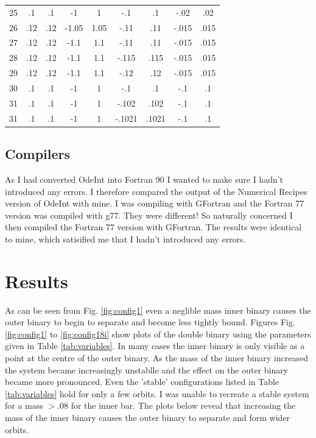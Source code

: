 \documentclass[a4paper,12pt]{article}
\begin{document}
\begin{table}[ht!]
\begin{tabular}{ccccccccc}
   25 & .1 & .1 & -1 & 1 & -.1 & .1 & -.02 & .02\\
   26 & .12 & .12 & -1.05 & 1.05 & -.11 & .11 & -.015 & .015\\
   27 & .12 & .12 & -1.1 & 1.1 & -.11 & .11 & -.015 & .015\\
   28 & .12 & .12 & -1.1 & 1.1 & -.115 & .115 & -.015 & .015\\
   29 & .12 & .12 & -1.1 & 1.1 & -.12 & .12 & -.015 & .015\\
   30 & .1 & .1 & -1 & 1 & -.1 & .1 & -.1 & .1\\
   31 & .1 & .1 & -1 & 1 & -.102 & .102 & -.1 & .1\\
   31 & .1 & .1 & -1 & 1 & -.1021 & .1021 & -.1 & .1\\
  \end{tabular}
\end{table}

\subsection{Compilers}
As I had converted OdeInt into Fortran 90 I wanted to make sure I hadn't introduced any errors. I therefore compared the output of the Numerical Recipes
version of OdeInt with mine. I was compiling with GFortran and the Fortran 77 version was compiled with g77. They were different! So naturally concerned 
I then compiled the Fortran 77 version with GFortran. The results were identical to mine, which satisified me that I hadn't introduced any errors.

\section{Results}
As can be seen from Fig. \ref{fig:config1} even a neglible mass inner binary causes the outer binary to begin to separate and become less tightly bound.
Figures Fig. \ref{fig:config1} to \ref{fig:config18i} show plots of the double binary using the parameters given in Table \ref{tab:variables}.
In many cases the inner binary is only visible as a point at the centre of the outer binary.
As the mass of the inner binary increased the system became increasingly unstablle and the effect on the outer binary became more pronounced.
Even the 'stable' configurations listed in Table \ref{tab:variables} hold for only a few orbits.
I was unable to recreate a stable system for a mass $>.08$ for the inner bar.
The plots below reveal that increasing the mass of the inner binary causes the outer binary to separate and
form wider orbits.
\end{document}
